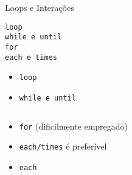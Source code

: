 
\begin{frame}{Loops e Interações}
  \begin{center}
    \Large \verb!loop! \\ \verb!while e until! \\ \verb!for! \\ \verb!each e times!
  \end{center}   
\framebreak

  \begin{itemize}
	\item \verb!loop!
  \end{itemize}
  

\framebreak
  \begin{itemize}
	\item \verb!while e until!
  \end{itemize}
     
  \begin{columns}
    \begin{column}{0.5\textwidth}
  
    \end{column}
    \begin{column}{0.5\textwidth}  %
  
    \end{column}
  \end{columns}

\framebreak
  \begin{itemize}
		\item \verb!for! (\alert{dificilmente empregado})
    \item \verb!each/times! é preferível
  \end{itemize}
  
  

\framebreak
  \begin{itemize}
	\item \verb!each!
  \end{itemize}
     
  \begin{columns}
    \begin{column}{0.5\textwidth}
    
    \end{column}
    \begin{column}{0.5\textwidth} 
  

    \end{column}
  \end{columns}
\end{frame}

